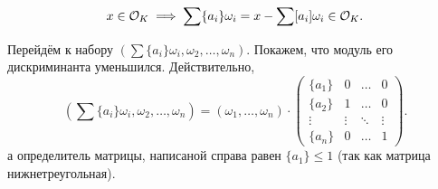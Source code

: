 \begin{homework}
			\[
				x \in \mathcal{O}_{K} \implies \sum \{ a_i \}\omega_{i} = x - \sum [a_i] \omega_i \in \mathcal{O}_{K}.
			\]

			Перейдём к набору $(\sum \{ a_i \}\omega_{i}, \omega_{2}, \ldots, \omega_{n})$. Покажем, что модуль его дискриминанта уменьшился. Действительно, 
			\[
				(\sum \{ a_i \}\omega_{i}, \omega_{2}, \ldots, \omega_{n}) = (\omega_{1}, \ldots, \omega_{n}) \cdot \begin{pmatrix} \{ a_{1}\} & 0 & \ldots & 0 \\ \{ a_{2}\} & 1 & \ldots & 0 \\ \vdots & \vdots & \ddots & \vdots \\ \{ a_n\} & 0 & \ldots & 1 \end{pmatrix}.
			\]
			а определитель матрицы, написаной справа равен $\{ a_1 \} \le 1$ (так как матрица нижнетреугольная).
		\end{homework}